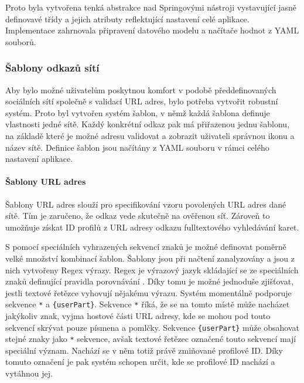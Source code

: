 		Proto byla vytvořena tenká abstrakce nad Springovými nástroji vystavující jasně definovavé třídy a jejich atributy
		reflektující nastavení celé aplikace.
		Implementace zahrnovala připravení datového modelu a načítače hodnot z \ac{YAML} souborů.


		\subsubsection{Šablony odkazů sítí}

		Aby bylo možné uživatelům poskytnou komfort v podobě předdefinovaných sociálních sítí společně s validací \ac{URL} adres,
		bylo potřeba vytvořit robustní systém.
		Proto byl vytvořen systém šablon, v němž každá šablona definuje vlastnosti jedné sítě.
		Každý konkrétní odkaz pak má přiřazenou jednu šablonu, na základě které je možné adresu validovat a
		zobrazit uživateli správnou ikonu a název sítě.
		Definice šablon jsou načítány z \ac{YAML} souboru v rámci celého nastavení aplikace.

			\paragraph{Šablony URL adres}

			Šablony \ac{URL} adres slouží pro specifikování vzoru povolených \ac{URL} adres dané sítě.
			Tím je zaručeno, že odkaz vede skutečně na ověřenou síť.
			Zároveň to umožňuje získat ID profilů z \ac{URL} adresy odkazu fulltextového
			vyhledávání karet.

			S pomocí speciálních vyhrazených sekvencí znaků je možné definovat poměrně velké množství kombinací
			šablon.
			Šablony jsou při načtení zanalyzovány a jsou z nich vytvořeny Regex výrazy.
			Regex je výrazový jazyk skládající se ze speciálních znaků definující pravidla porovnávání \cite{regex}.
			Díky tomu je možné jednoduše zjišťovat, jestli textové řetězce vyhovují nějakému výrazu.
			Systém momentálně podporuje sekvence \lstinline{*} a \lstinline!{userPart}!.
			Sekvence \lstinline{*} říká, že se na tomto místě může nacházet jakýkoliv znak, vyjma hostové části \ac{URL}
			adresy, kde se mohou pod touto sekvencí skrývat pouze písmena a pomlčky.
			Sekvence \lstinline!{userPart}! může obsahovat stejné znaky jako \lstinline{*} sekvence, avšak textové
			řetězec označené touto sekvencí mají speciální význam.
			Nachází se v něm totiž právě zmiňované profilové ID.
			Díky tomuto označení je pak systém schopen určit, kde se profilové ID nachází a vytáhnou jej.

